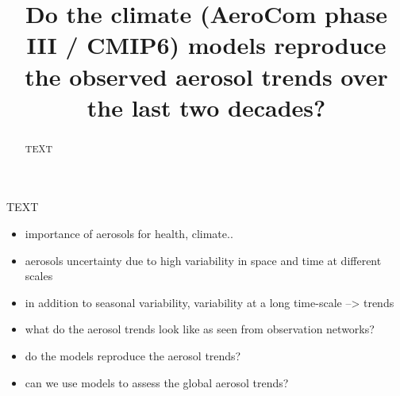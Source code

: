 \documentclass[journal abbreviation, manuscript]{copernicus}
\begin{document}
\title{Do the  climate (AeroCom phase III / CMIP6) models reproduce the observed aerosol trends over the last two decades?}














\received{}
\pubdiscuss{} %
\revised{}
\accepted{}
\published{}




\maketitle

\tableofcontents

\begin{abstract}
 TEXT
\end{abstract}




\introduction  %
TEXT
\begin{itemize}
 \item importance of aerosols for health, climate..
 \item aerosols uncertainty due to high variability in space and time at different scales
 \item in addition to seasonal variability, variability at a long time-scale --> trends
 \item what do the aerosol trends look like as seen from observation networks?
 \item do the models reproduce the aerosol trends?
 \item can we use models to assess the global aerosol trends?
\end{itemize}
\end{document}
